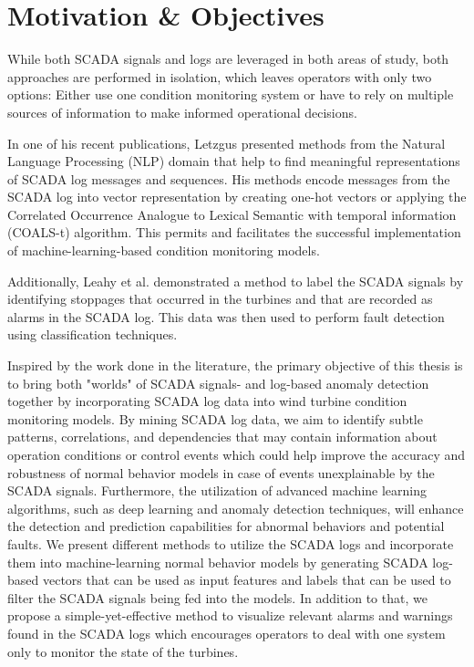 \section{Motivation \& Objectives}
While both SCADA signals and logs are leveraged in both areas of study, both approaches are performed in isolation, which leaves 
operators with only two options: Either use one condition monitoring system or have to rely on multiple sources of information 
to make informed operational decisions.
\par In one of his recent publications, Letzgus \cite{Letzgus_Log} presented methods from the Natural Language Processing (NLP) domain 
that help to find meaningful representations of SCADA log messages and sequences. 
His methods encode messages from the SCADA log into vector representation by creating one-hot vectors or applying the 
Correlated Occurrence Analogue to Lexical Semantic with temporal information (COALS-t) algorithm. 
This permits and facilitates the successful implementation of machine-learning-based condition monitoring models.
\par Additionally, Leahy et al. \cite{Leahy} demonstrated a method to label the SCADA signals by identifying stoppages that occurred in the turbines 
and that are recorded as alarms in the SCADA log. This data was then used to perform fault detection using classification techniques.

\par Inspired by the work done in the literature, the primary objective of this thesis is to bring both "worlds" of SCADA signals- and log-based anomaly detection together 
by incorporating SCADA log data into wind turbine condition monitoring models. 
By mining SCADA log data, we aim to identify subtle patterns, correlations, and dependencies that may contain information about operation conditions or 
control events which could help improve the accuracy and robustness of normal behavior models in case of events unexplainable by the SCADA signals. 
Furthermore, the utilization of advanced machine learning algorithms, such as deep learning and anomaly detection techniques, will enhance the detection and prediction capabilities for abnormal behaviors and potential faults.
We present different methods to utilize the SCADA logs and incorporate them into machine-learning normal behavior models by generating SCADA log-based vectors that can be used 
as input features and labels that can be used to filter the SCADA signals being fed into the models. In addition to that, we propose a simple-yet-effective method to visualize 
relevant alarms and warnings found in the SCADA logs which encourages operators to deal with one system only to monitor the state of the turbines.

